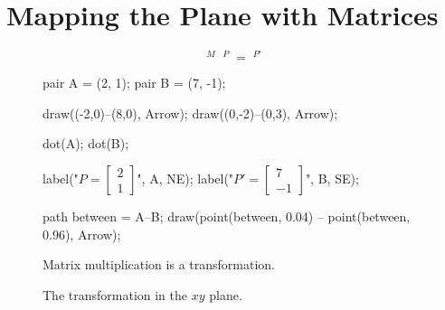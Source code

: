 \documentclass[../textbook.tex]{subfiles}
\begin{document}
\section{Mapping the Plane with Matrices}

\begin{figure}[h]
	\begin{center}
		\begin{minipage}[b]{0.45\textwidth}
			\centering
			$$\mathop{\left[ \begin{array}{cc} 2 & 3 \\ -1 & 1 \end{array}\right]}^{M}
			\mathop{\left[ \begin{array}{c} 2 \\ 1 \end{array}\right]}^{P} = \mathop{\left[ \begin{array}{c} 7 \\ -1 \end{array} \right]}^{P'}$$
			\vspace*{0.5\baselineskip}
		\end{minipage}
		\hfill
		\begin{minipage}[b]{0.45\textwidth}
			\centering
			\begin{asy}[width=0.7\textwidth]
				pair A = (2, 1);
				pair B = (7, -1);

				draw((-2,0)--(8,0), Arrow);
				draw((0,-2)--(0,3), Arrow);

				dot(A);
				dot(B);

				label("$P=\left[ \begin{array}{c} 2 \\ 1 \end{array}\right]$", A, NE);
				label("$P'=\left[ \begin{array}{c} 7 \\ -1 \end{array} \right]$", B, SE);

				path between = A--B;
				draw(point(between, 0.04) -- point(between, 0.96), Arrow);
			\end{asy}
		\end{minipage}
	\end{center}
	\vspace*{-2\baselineskip}
	\begin{center}
		\begin{minipage}[t]{0.45\textwidth}
			\caption{Matrix multiplication is a transformation.}
			\label{fig:random_matrix}
		\end{minipage}
		\hfill
		\begin{minipage}[t]{0.45\textwidth}
			\caption{The transformation in the $xy$ plane.}
			\label{fig:geo_interp}
		\end{minipage}
	\end{center}
	\vspace*{-2\baselineskip}
\end{figure}
\end{document}
